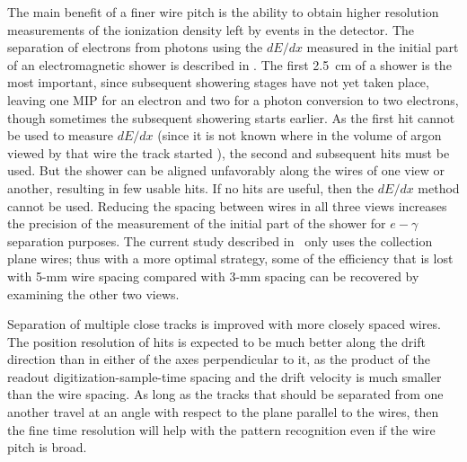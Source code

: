The main benefit of a finer wire pitch is the ability to obtain higher resolution
measurements of the ionization density left by events in the detector.
The separation of electrons from photons using the $dE/dx$ measured in
the initial part of an electromagnetic shower is described in
\anxreco.  The first 2.5~cm of a shower is the most important, since 
subsequent showering stages have not yet taken place, leaving one MIP
for an electron and two for a photon conversion to two electrons,
though sometimes the subsequent showering starts earlier.  As the
first hit cannot be used to measure $dE/dx$ (since it is not known
where in the volume of argon viewed by that wire the track started ),
the second and subsequent hits must be used.  But the shower can be
aligned unfavorably along the wires of one view or another, resulting
in few usable hits.  If no hits are useful, then the $dE/dx$ method
cannot be used.  Reducing the spacing between wires in all three views
increases the precision of the measurement of the initial part of the
shower for $e-\gamma$ separation purposes.  The current study
described in \anxreco\ only uses the collection plane wires; 
thus with a more optimal strategy, some of the efficiency that is lost
with 5-mm wire spacing compared with 3-mm spacing can be recovered by
examining the other two views.

Separation of multiple close tracks is improved with more closely
spaced wires.  The position resolution of hits is expected to be much
better along the drift direction than in either of the axes
perpendicular to it, as the product of the readout digitization-sample-time spacing  
and the drift velocity is much smaller than the wire spacing.  As
long as the tracks %
that should be separated from one another
travel at %
an angle with respect to the plane parallel to the wires, 
then the fine time resolution will help with the pattern recognition
even if the wire pitch is broad.

